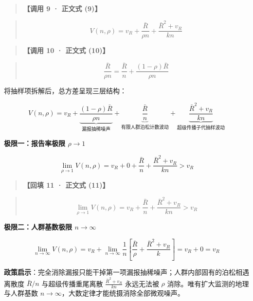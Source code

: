\documentclass[11pt,a4paper]{ctexart}
\begin{document}
\begin{quote}\small\color{black!75}
\textbf{【调用 9 · 正文式 (9)】}
\end{quote}
\begin{quote}\small\color{black!75}
\begin{equation*}
V(n, \rho) = v_R + \frac{\bar{R}}{\rho n} + \frac{\bar{R}^2 + v_R}{k n} \tag{eq:var\_bivariate}
\end{equation*}
\end{quote}

\begin{quote}\small\color{black!75}
\textbf{【调用 10 · 正文式 (10)】}
\end{quote}
\begin{quote}\small\color{black!75}
\begin{equation*}
\frac{\bar{R}}{\rho n} = \frac{\bar{R}}{n} + \frac{(1 - \rho)\bar{R}}{\rho n} \tag{eq:rho\_decomp}
\end{equation*}
\end{quote}

将抽样项拆解后，总方差呈现三层结构：

\[
V(n, \rho) = v_R + \underbrace{\frac{(1 - \rho)\bar{R}}{\rho n}}_{\text{漏报抽稀噪声}} + \underbrace{\frac{\bar{R}}{n}}_{\text{有限人群泊松计数波动}} + \underbrace{\frac{\bar{R}^2 + v_R}{kn}}_{\text{超级传播子代抽样波动}}
\]

\textbf{极限一：报告率极限 $\rho \to 1$}

\[
\lim_{\rho \to 1} V(n, \rho) = v_R + 0 + \frac{\bar{R}}{n} + \frac{\bar{R}^2 + v_R}{kn} > v_R
\]

\begin{quote}\small\color{black!75}
\textbf{【回填 11 · 正文式 (11)】}
\end{quote}
\begin{quote}\small\color{black!75}
\begin{equation*}
\lim_{\rho \to 1} V(n, \rho) = v_R + \frac{\bar{R}}{n} + \frac{\bar{R}^2 + v_R}{k n} > v_R \tag{eq:rho\_limit}
\end{equation*}
\end{quote}

\textbf{极限二：人群基数极限 $n \to \infty$}

\[
\lim_{n \to \infty} V(n, \rho) = v_R + \lim_{n \to \infty} \frac{1}{n} \left[ \frac{\bar{R}}{\rho} + \frac{\bar{R}^2 + v_R}{k} \right] = v_R + 0 = v_R
\]

\textbf{政策启示}：完全消除漏报只能干掉第一项漏报抽稀噪声；人群内部固有的泊松相遇离散度 $\bar{R}/n$ 与超级传播重尾离散 $\frac{\bar{R}^2+v_R}{kn}$ 永远无法被 $\rho$ 消除。唯有扩大监测的地理与人群基数 $n \to \infty$，大数定律才能统摄消除全部微观噪声。
\end{document}
